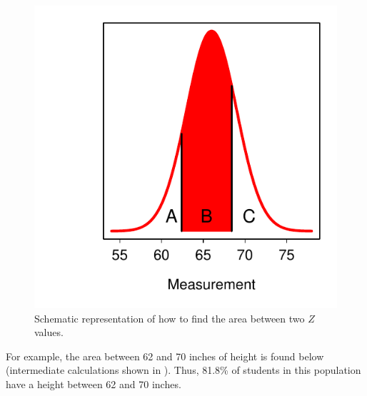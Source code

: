 \documentclass[10pt,openany]{book}\usepackage[]{graphicx}\usepackage[]{color}
\newenvironment{knitrout}{}{} %
\begin{document}
\begin{knitrout}
\color{fgcolor}\begin{figure}[hbtp]

{\centering \includegraphics[width=.4\linewidth]{Figs/NormDistBetween-1} 

}

\caption[Schematic representation of how to find the area between two $Z$ values]{Schematic representation of how to find the area between two $Z$ values.}\label{fig:NormDistBetween}
\end{figure}


\end{knitrout}
\vspace{12pt} %

For example, the area between 62 and 70 inches of height is found below (intermediate calculations shown in ). Thus, 81.8\% of students in this population have a height between 62 and 70 inches.
\end{document}
